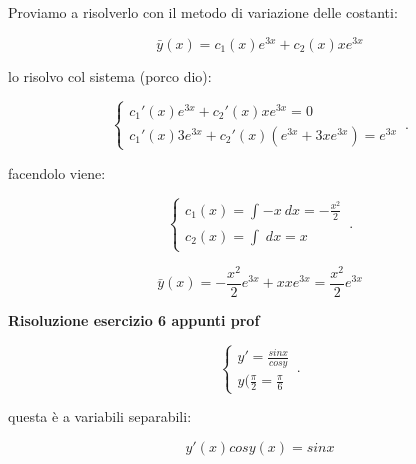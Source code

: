 \documentclass[11pt]{article}
\begin{document}
Proviamo a risolverlo con il metodo di variazione delle costanti:

\[
    \bar{y} (x) = c_1(x) e ^{3x}+ c_2(x) x e^{3x}
\]

lo risolvo col sistema (porco dio):

    \begin{equation}
        \begin{cases}
    c_1'(x)e ^{3x} + c_2'(x) x e ^{3x}=0 \\
    c_1'(x) 3 e ^{3x} + c_2'(x) (e ^{3x} + 3x e ^{3x}) = e ^{3x}
        \end{cases}\,.
    \end{equation}


facendolo viene:

    \begin{equation}
        \begin{cases}
            c_1(x) = \int_{}^{} {-x} \: dx =-\frac{x^{2}}{2}\\
            c_2(x) = \int_{}^{} {} \: dx  = x
        \end{cases}\,.
    \end{equation}

\[
    \bar{y} (x) = - \frac{x^{2}}{2}e ^{3x} + x x e ^{3x} = \frac{x^{2}}{2}e ^{3x}
\]


\textbf{Risoluzione esercizio 6 appunti prof} 

    \begin{equation}
        \begin{cases}
            y'= \frac{sinx}{cosy}\\
            y( \frac{\pi}{2} = \frac{\pi}{6}
        \end{cases}\,.
    \end{equation}

questa è a variabili separabili:

\[
    y'(x) cosy(x) = sinx
\]
\end{document}
